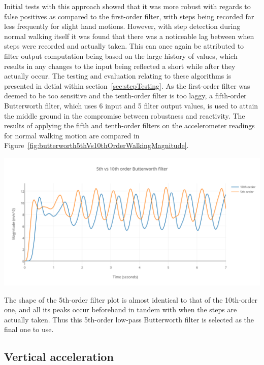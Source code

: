 \documentclass[12pt,a4paper]{report}
\begin{document}
Initial tests with this approach showed that it was more robust with regards to false positives as compared to the first-order filter, with steps being recorded far less frequently for slight hand motions. However, with step detection during normal walking itself it was found that there was a noticeable lag between when steps were recorded and actually taken. This can once again be attributed to filter output computation being based on the large history of values, which results in any changes to the input being reflected a short while after they actually occur. The testing and evaluation relating to these algorithms is presented in detial within section~\ref{sec:stepTesting}. As the first-order filter was deemed to be too sensitive and the tenth-order filter is too laggy, a fifth-order Butterworth filter, which uses 6 input and 5 filter output values, is used to attain the middle ground in the compromise between robustness and reactivity. The results of applying the fifth and tenth-order filters on the accelerometer readings for normal walking motion are compared in Figure~\ref{fig:butterworth5thVs10thOrderWalkingMagnitude}.  

\begin{center}
\includegraphics[scale=0.9]{images/butterworth5thVs10thOrderWalkingMagnitude.png}
\label{fig:butterworth5thVs10thOrderWalkingMagnitude}
\end{center}

The shape of the 5th-order filter plot is almost identical to that of the 10th-order one, and all its peaks occur beforehand in tandem with when the steps are actually taken. Thus this 5th-order low-pass Butterworth filter is selected as the final one to use. 

\subsection{Vertical acceleration}
\end{document}
